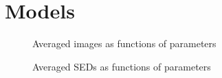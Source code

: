 \section{Models}\label{app:models}

\begin{figure}
  \caption{Averaged images as functions of parameters}
  \label{fig:imgs}
\end{figure}

\begin{figure}
  \caption{Averaged SEDs as functions of parameters}
  \label{fig:seds}
\end{figure}
